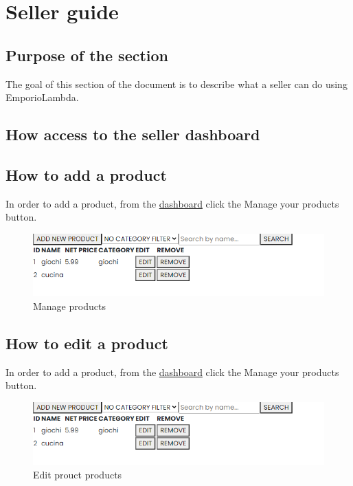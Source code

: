 \section{Seller guide} \label{_venditore}
\subsection{Purpose of the section}
The goal of this section of the document is to describe what a seller can do using EmporioLambda.

\subsection{How access to the seller dashboard} \label{_dashboard}

\subsection{How to add a product}
In order to add a product, from the \hyperref[_dashboard]{dashboard} click the Manage your products button.
\begin{figure}[H]
    \centering
    \includegraphics[width=\linewidth]{res/images/venditore/manageproducts.png}
    \caption{Manage products}
\end{figure}

\subsection{How to edit a product}
In order to add a product, from the \hyperref[_dashboard]{dashboard} click the Manage your products button.
\begin{figure}[H]
    \centering
    \includegraphics[width=\linewidth]{res/images/venditore/manageproducts.png}
    \caption{Edit prouct products}
\end{figure}

